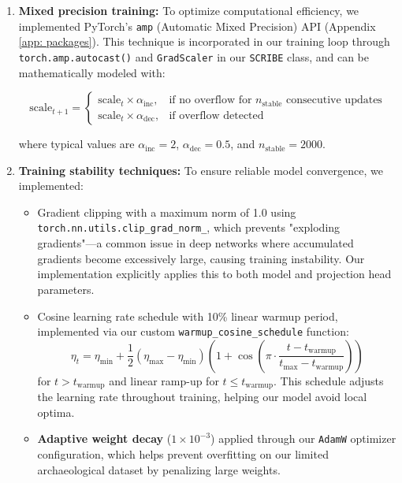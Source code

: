 \documentclass[11pt,a4paper,oneside]{report}
\begin{document}
\begin{enumerate}
    \item \textbf{Mixed precision training:} To optimize computational efficiency, we implemented PyTorch's \texttt{amp} (Automatic Mixed Precision) API (Appendix \ref{app: packages}). This technique is incorporated in our training loop through \texttt{torch.amp.autocast()} and \texttt{GradScaler} in our \texttt{SCRIBE} class, and can be mathematically modeled with:
    
    \begin{equation}
    \text{scale}_{t+1} = 
    \begin{cases}
        \text{scale}_t \times \alpha_{\text{inc}}, & \text{if no overflow for $n_{\text{stable}}$ consecutive updates} \\
        \text{scale}_t \times \alpha_{\text{dec}}, & \text{if overflow detected}
    \end{cases}
    \end{equation}
    
    where typical values are $\alpha_{\text{inc}}=2$, $\alpha_{\text{dec}}=0.5$, and $n_{\text{stable}}=2000$.

    \item \textbf{Training stability techniques:} To ensure reliable model convergence, we implemented:
    \begin{itemize}
        \item Gradient clipping with a maximum norm of 1.0 using \texttt{torch.nn.utils.clip\_grad\_norm\_}, which prevents "exploding gradients"—a common issue in deep networks where accumulated gradients become excessively large, causing training instability. Our implementation explicitly applies this to both model and projection head parameters.
        
        \item Cosine learning rate schedule with 10\% linear warmup period, implemented via our custom \texttt{warmup\_cosine\_schedule} function:
        \begin{equation}
        \eta_t = \eta_{\text{min}} + \frac{1}{2}(\eta_{\text{max}} - \eta_{\text{min}})(1 + \cos(\pi \cdot \frac{t-t_{\text{warmup}}}{t_{\text{max}}-t_{\text{warmup}}}))
        \end{equation}
        for $t > t_{\text{warmup}}$ and linear ramp-up for $t \leq t_{\text{warmup}}$. This schedule adjusts the learning rate throughout training, helping our model avoid local optima.
        
        \item \textbf{Adaptive weight decay} ($1 \times 10^{-3}$) applied through our \texttt{AdamW} optimizer configuration, which helps prevent overfitting on our limited archaeological dataset by penalizing large weights.
    \end{itemize}
\end{enumerate}
\end{document}
